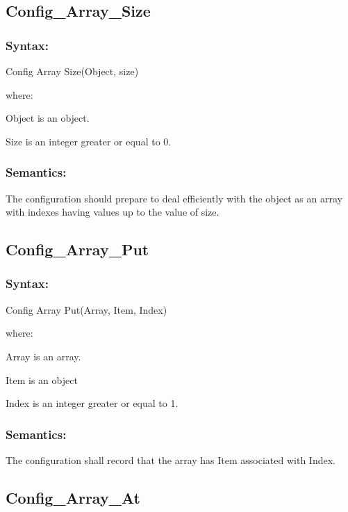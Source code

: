 \subsection{Config\_Array\_Size}\label{config_array_size}

\subsubsection{Syntax:}\label{syntax-11}

Config Array Size(Object, size)

where:

Object is an object.

Size is an integer greater or equal to 0.

\subsubsection{Semantics:}\label{semantics-12}

The configuration should prepare to deal efficiently with the object as
an array with indexes having values up to the value of size.

\subsection{Config\_Array\_Put}\label{config_array_put}

\subsubsection{Syntax:}\label{syntax-12}

Config Array Put(Array, Item, Index)

where:

Array is an array.

Item is an object

Index is an integer greater or equal to 1.

\subsubsection{Semantics:}\label{semantics-13}

The configuration shall record that the array has Item associated with
Index.

\subsection{Config\_Array\_At}\label{config_array_at}

